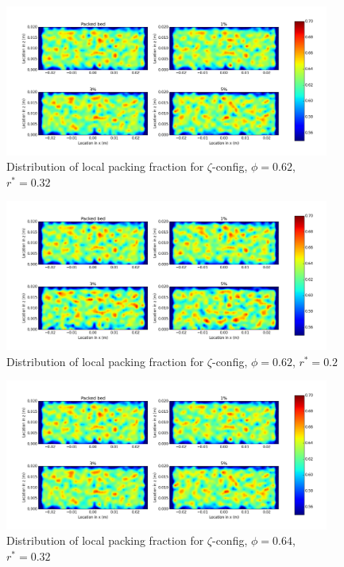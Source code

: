 \begin{figure}[!t]
    \centering
    \includegraphics[width = 0.95\textwidth]{figures/z-62-r23-1.png}
    \caption{Distribution of local packing fraction for $\zeta$-config, $\phi = 0.62$, $r^* = 0.32$}\label{fig:z-62-r23}
\end{figure}
\begin{figure}[!t]
    \centering
    \includegraphics[width = 0.95\textwidth]{figures/z-62-r125-1.png}
    \caption{Distribution of local packing fraction for $\zeta$-config, $\phi = 0.62$, $r^* = 0.2$}\label{fig:z-62-r125}
\end{figure}
\begin{figure}[!t]
    \centering
    \includegraphics[width = 0.95\textwidth]{figures/z-62-r23-1.png}
    \caption{Distribution of local packing fraction for $\zeta$-config, $\phi = 0.64$, $r^* = 0.32$}\label{fig:z-624-r23}
\end{figure}
